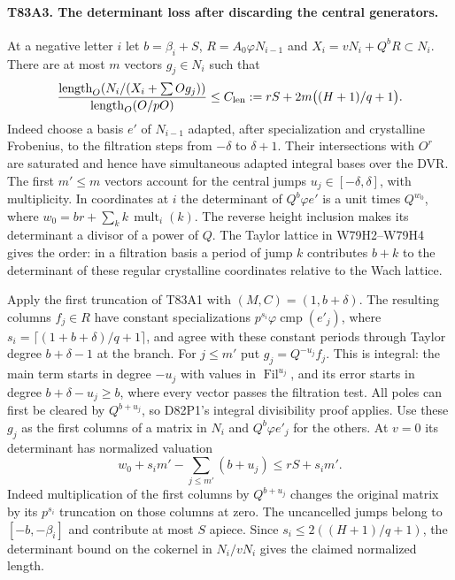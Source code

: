 \paragraph{T83A3. The determinant loss after discarding the central generators.}
At a negative letter $i$ let $b=\beta_i+S$,
$R=A_0\varphi N_{i-1}$ and $X_i=vN_i+Q^bR\subset N_i$.
There are at most $m$ vectors $g_j\in N_i$ such that
\[
 \frac{\operatorname{length}_O(N_i/(X_i+\sum Og_j))}
 {\operatorname{length}_O(O/pO)}
 \le C_{\rm len}:=rS+2m\bigl((H+1)/q+1\bigr).
\]
Indeed choose a basis $e'$ of $N_{i-1}$ adapted, after specialization
and crystalline Frobenius, to the filtration steps from
$-\delta$ to $\delta+1$. Their intersections with $O^r$ are
saturated and hence have simultaneous adapted integral bases over
the DVR. The first $m'\le m$ vectors account for the central jumps
$u_j\in[-\delta,\delta]$, with multiplicity.
In coordinates at $i$ the determinant of $Q^b\varphi e'$ is
a unit times $Q^{w_0}$, where
$w_0=br+\sum_k k\,\operatorname{mult}_i(k)$.
The reverse height inclusion makes its determinant a divisor of
a power of $Q$. The Taylor lattice in W79H2--W79H4 gives the
order: in a filtration basis a period of jump $k$ contributes
$b+k$ to the determinant of these regular crystalline coordinates
relative to the Wach lattice.

Apply the first truncation of T83A1 with $(M,C)=(1,b+\delta)$.
The resulting columns $f_j\in R$ have constant specializations
$p^{s_i}\varphi\operatorname{cmp}(e'_j)$, where
$s_i=\lceil(1+b+\delta)/q+1\rceil$, and agree with these
constant periods through Taylor degree $b+\delta-1$ at the branch.
For $j\le m'$ put $g_j=Q^{-u_j}f_j$. This is integral:
the main term starts in degree $-u_j$ with values in
$\operatorname{Fil}^{u_j}$, and its error starts in degree
$b+\delta-u_j\ge b$, where every vector passes the filtration
test. All poles can first be cleared by $Q^{b+u_j}$, so
D82P1's integral divisibility proof applies.
Use these $g_j$ as the first columns of a matrix in $N_i$ and
$Q^b\varphi e'_j$ for the others. At $v=0$ its determinant has
normalized valuation
\[
       w_0+s_i m'-\sum_{j\le m'}(b+u_j)\le rS+s_i m' .
\]
Indeed multiplication of the first columns by $Q^{b+u_j}$ changes
the original matrix by its $p^{s_i}$ truncation on those columns
at zero. The uncancelled jumps belong to $[-b,-\beta_i]$ and
contribute at most $S$ apiece. Since $s_i\le2((H+1)/q+1)$,
the determinant bound on the cokernel in $N_i/vN_i$ gives
the claimed normalized length.

